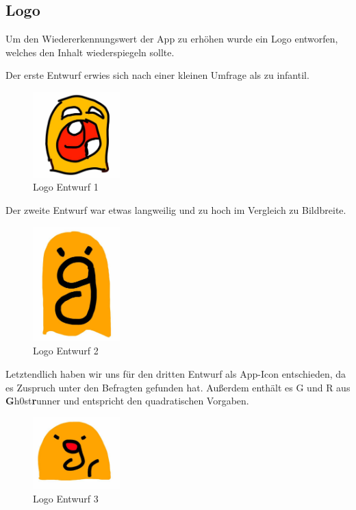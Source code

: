 \subsection{Logo}
Um den Wiedererkennungswert der App zu erhöhen wurde ein Logo entworfen, welches den Inhalt wiederspiegeln sollte.

Der erste Entwurf erwies sich nach einer kleinen Umfrage als zu infantil.

\begin{figure}[!h]
\centering
\includegraphics[width=0.3\textwidth]{abb/icon_entwurf1}
\caption{Logo Entwurf 1}
\end{figure}
Der zweite Entwurf war etwas langweilig und zu hoch im Vergleich zu Bildbreite. 

\begin{figure}[!h]
\centering
\includegraphics[width=0.3\textwidth]{abb/icon_entwurf2}
\caption{Logo Entwurf 2}
\end{figure}
Letztendlich haben wir uns für den dritten Entwurf als App-Icon entschieden, da es Zuspruch unter den Befragten gefunden hat. Außerdem enthält es G und R aus \textbf{G}h0st\textbf{r}unner und entspricht den quadratischen Vorgaben.
\begin{figure}[!h]
\centering
\includegraphics[width=0.3\textwidth]{abb/icon_entwurf3}
\caption{Logo Entwurf 3}
\end{figure}

